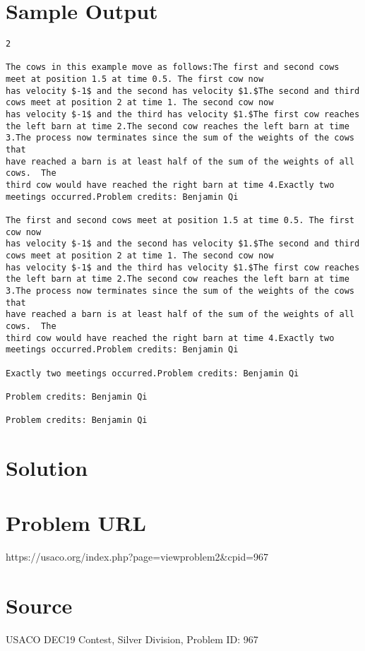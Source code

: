 \documentclass[12pt]{article}
\begin{document}
\section*{Sample Output}
\begin{verbatim}
2

The cows in this example move as follows:The first and second cows meet at position 1.5 at time 0.5. The first cow now
has velocity $-1$ and the second has velocity $1.$The second and third cows meet at position 2 at time 1. The second cow now
has velocity $-1$ and the third has velocity $1.$The first cow reaches the left barn at time 2.The second cow reaches the left barn at time 3.The process now terminates since the sum of the weights of the cows that 
have reached a barn is at least half of the sum of the weights of all cows.  The
third cow would have reached the right barn at time 4.Exactly two meetings occurred.Problem credits: Benjamin Qi

The first and second cows meet at position 1.5 at time 0.5. The first cow now
has velocity $-1$ and the second has velocity $1.$The second and third cows meet at position 2 at time 1. The second cow now
has velocity $-1$ and the third has velocity $1.$The first cow reaches the left barn at time 2.The second cow reaches the left barn at time 3.The process now terminates since the sum of the weights of the cows that 
have reached a barn is at least half of the sum of the weights of all cows.  The
third cow would have reached the right barn at time 4.Exactly two meetings occurred.Problem credits: Benjamin Qi

Exactly two meetings occurred.Problem credits: Benjamin Qi

Problem credits: Benjamin Qi

Problem credits: Benjamin Qi
\end{verbatim}

\section*{Solution}


\section*{Problem URL}
https://usaco.org/index.php?page=viewproblem2&cpid=967

\section*{Source}
USACO DEC19 Contest, Silver Division, Problem ID: 967
\end{document}
